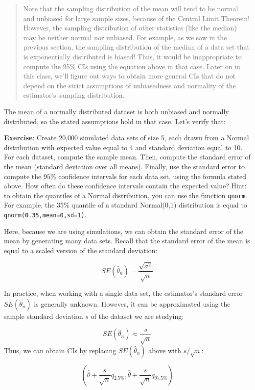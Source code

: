 \documentclass[
]{book}
\begin{document}
\begin{quote}
Note that the sampling distribution of the mean will tend to be normal and unbiased for large sample sizes, because of the Central Limit Theorem! However, the sampling distribution of other statistics (like the median) may be neither normal nor unbiased. For example, as we saw in the previous section, the sampling distribution of the median of a data set that is exponentially distributed is biased! Thus, it would be inappropriate to compute the 95\% CIs using the equation above in that case. Later on in this class, we'll figure out ways to obtain more general CIs that do not depend on the strict assumptions of unbiasedness and normality of the estimator's sampling distribution.
\end{quote}

The mean of a normally distributed dataset is both unbiased and normally distributed, so the stated assumptions hold in that case. Let's verify that:

\textbf{Exercise}: Create 20,000 simulated data sets of size 5, each drawn from a Normal distribution with expected value equal to 4 and standard deviation equal to 10. For each dataset, compute the sample mean. Then, compute the standard error of the mean (standard deviation over all means). Finally, use the standard error to compute the \(95\%\) confidence intervals for each data set, using the formula stated above. How often do these confidence intervals contain the expected value? Hint: to obtain the quantiles of a Normal distribution, you can use the function \texttt{qnorm}. For example, the \(35\%\) quantile of a standard Normal(0,1) distribution is equal to \texttt{qnorm(0.35,mean=0,sd=1)}.

Here, because we are using simulations, we can obtain the standard error of the mean by generating many data sets. Recall that the standard error of the mean is equal to a scaled version of the standard deviation:

\[SE(\hat{\theta}_n) = \frac{\sqrt{\sigma^2}}{\sqrt{n}}\]

In practice, when working with a single data set, the estimator's standard error \(SE(\hat{\theta}_n)\) is generally unknown. However, it can be approximated using the sample standard deviation \(s\) of the dataset we are studying:

\[SE(\hat{\theta}_n) \approx \frac{s}{\sqrt{n}}\]
Thus, we can obtain CIs by replacing \(SE(\hat{\theta}_n)\) above with \(s/\sqrt{n}\):

\[(\hat{\theta} + \frac{s}{\sqrt{n}}q_{2.5\%}, \hat{\theta} + \frac{s}{\sqrt{n}}q_{97.5\%})\]
\end{document}
